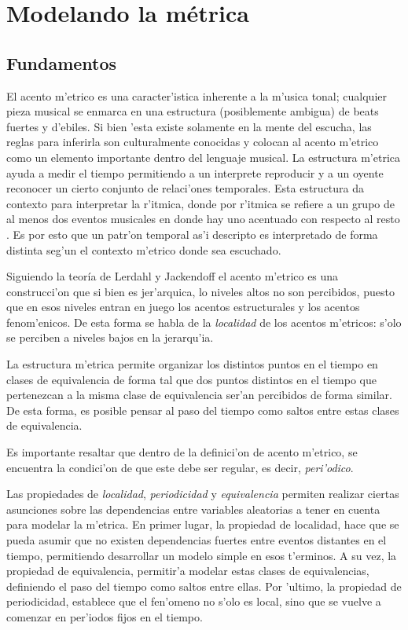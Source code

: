 \section{Modelando la m\'etrica}
\label{sec:metric_model}
\subsection{Fundamentos}
El acento m'etrico es una caracter'istica inherente a la m'usica tonal; cualquier pieza musical se enmarca en una estructura 
(posiblemente ambigua) de beats fuertes y d'ebiles. Si bien 'esta existe solamente en la mente del escucha, las reglas para inferirla son culturalmente conocidas 
y colocan al acento m'etrico como un elemento importante dentro del lenguaje musical. La estructura m'etrica ayuda a medir el tiempo permitiendo a un interprete 
reproducir y a un oyente reconocer un cierto conjunto de relaci'ones temporales. Esta estructura da contexto para interpretar la r'itmica,  
donde por r'itmica se refiere a un grupo de al menos dos eventos musicales en donde hay uno acentuado con respecto al resto \cite{CooperMeyer60}.
Es por esto que un patr'on temporal as'i descripto es interpretado de forma distinta seg'un el contexto m'etrico donde sea escuchado. 

Siguiendo la teor\'ia de Lerdahl y Jackendoff el acento m'etrico es una construcci'on que si bien es jer'arquica, lo niveles altos no son percibidos, puesto
que en esos niveles entran en juego los acentos estructurales y los acentos fenom'enicos. De esta forma se habla de la \emph{localidad} de los acentos m'etricos: 
s'olo se perciben a niveles bajos en la jerarqu'ia. 

La estructura m'etrica permite organizar los distintos puntos en el tiempo en clases de 
equivalencia de forma tal que dos puntos distintos en el tiempo que pertenezcan a la misma clase de equivalencia ser'an percibidos de forma similar\cite{Benjamin84}. 
De esta forma, es posible pensar al paso del tiempo como saltos entre estas clases de equivalencia.

Es importante resaltar que dentro de la definici'on de acento m'etrico, se encuentra la condici'on de que este debe ser regular, es decir, \emph{peri'odico}. 

Las propiedades de \emph{localidad}, \emph{periodicidad} y \emph{equivalencia} permiten realizar ciertas asunciones sobre las dependencias entre variables aleatorias 
a tener en cuenta para modelar la m'etrica. En primer lugar, la propiedad de localidad, hace que se pueda asumir que no existen dependencias fuertes entre eventos distantes 
en el tiempo, permitiendo desarrollar un modelo simple en esos t'erminos.  A su vez, la propiedad de equivalencia, permitir'a modelar estas clases de equivalencias, 
definiendo el paso del tiempo como saltos entre ellas. Por 'ultimo, la propiedad de periodicidad, establece que el fen'omeno no s'olo es local, 
sino que se vuelve a comenzar en per'iodos fijos en el tiempo.

